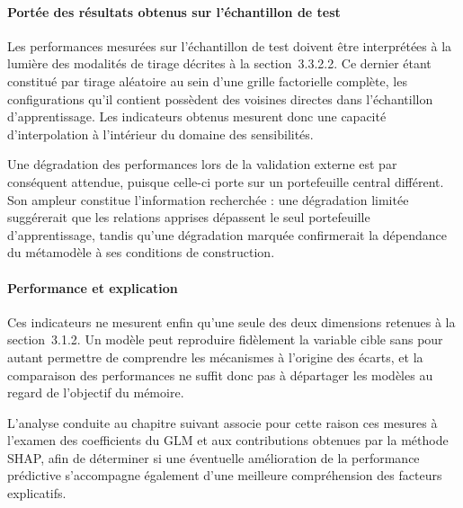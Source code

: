 \paragraph{Portée des résultats obtenus sur l'échantillon de test}
Les performances mesurées sur l'échantillon de test doivent être interprétées à la lumière 
des modalités de tirage décrites à la section~3.3.2.2. Ce dernier étant constitué par 
tirage aléatoire au sein d'une grille factorielle complète, les configurations qu'il 
contient possèdent des voisines directes dans l'échantillon d'apprentissage. Les 
indicateurs obtenus mesurent donc une capacité d'interpolation à l'intérieur du domaine des 
sensibilités.

Une dégradation des performances lors de la validation externe est par conséquent attendue, 
puisque celle-ci porte sur un portefeuille central différent. Son ampleur constitue 
l'information recherchée : une dégradation limitée suggérerait que les relations apprises 
dépassent le seul portefeuille d'apprentissage, tandis qu'une dégradation marquée 
confirmerait la dépendance du métamodèle à ses conditions de construction.

\paragraph{Performance et explication}
Ces indicateurs ne mesurent enfin qu'une seule des deux dimensions retenues à la 
section~3.1.2. Un modèle peut reproduire fidèlement la variable cible sans pour autant 
permettre de comprendre les mécanismes à l'origine des écarts, et la comparaison des 
performances ne suffit donc pas à départager les modèles au regard de l'objectif du 
mémoire.

L'analyse conduite au chapitre suivant associe pour cette raison ces mesures à l'examen des 
coefficients du GLM et aux contributions obtenues par la méthode SHAP, afin de déterminer 
si une éventuelle amélioration de la performance prédictive s'accompagne également d'une 
meilleure compréhension des facteurs explicatifs.
